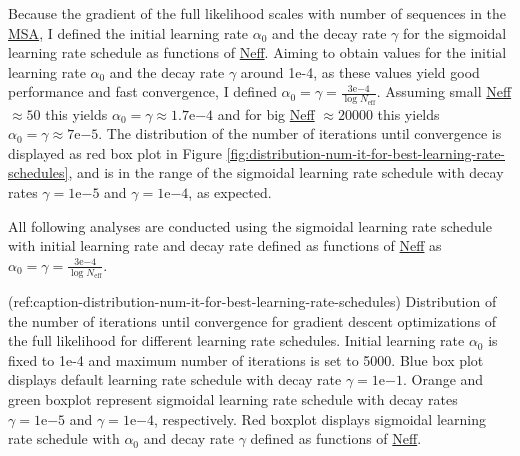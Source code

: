 \documentclass[12pt,a4paper,twoside]{book}
\theoremstyle{definition}
\theoremstyle{definition}
\theoremstyle{remark}
\begin{document}
Because the gradient of the full likelihood scales with number of
sequences in the \protect\hyperlink{abbrev}{MSA}, I defined the initial
learning rate \(\alpha_0\) and the decay rate \(\gamma\) for the
sigmoidal learning rate schedule as functions of
\protect\hyperlink{abbrev}{Neff}. Aiming to obtain values for the
initial learning rate \(\alpha_0\) and the decay rate \(\gamma\) around
1e-4, as these values yield good performance and fast convergence, I
defined
\(\alpha_0 = \gamma = \frac{3\mathrm{e}{-4}}{\log N_{\text{eff}}}\).
Assuming small \protect\hyperlink{abbrev}{Neff} \(\approx 50\) this
yields \(\alpha_0 = \gamma \approx 1.7\mathrm{e}{-4}\) and for big
\protect\hyperlink{abbrev}{Neff} \(\approx 20000\) this yields
\(\alpha_0 = \gamma \approx 7\mathrm{e}{-5}\). The distribution of the
number of iterations until convergence is displayed as red box plot in
Figure \ref{fig:distribution-num-it-for-best-learning-rate-schedules},
and is in the range of the sigmoidal learning rate schedule with decay
rates \(\gamma = 1\mathrm{e}{-5}\) and \(\gamma = 1\mathrm{e}{-4}\), as
expected.

All following analyses are conducted using the sigmoidal learning rate
schedule with initial learning rate and decay rate defined as functions
of \protect\hyperlink{abbrev}{Neff} as
\(\alpha_0 = \gamma = \frac{3\mathrm{e}{-4}}{\log N_{\text{eff}}}\).

(ref:caption-distribution-num-it-for-best-learning-rate-schedules)
Distribution of the number of iterations until convergence for gradient
descent optimizations of the full likelihood for different learning rate
schedules. Initial learning rate \(\alpha_0\) is fixed to 1e-4 and
maximum number of iterations is set to 5000. Blue box plot displays
default learning rate schedule with decay rate
\(\gamma = 1\mathrm{e}{-1}\). Orange and green boxplot represent
sigmoidal learning rate schedule with decay rates
\(\gamma = 1\mathrm{e}{-5}\) and \(\gamma = 1\mathrm{e}{-4}\),
respectively. Red boxplot displays sigmoidal learning rate schedule with
\(\alpha_0\) and decay rate \(\gamma\) defined as functions of
\protect\hyperlink{abbrev}{Neff}.
\end{document}
